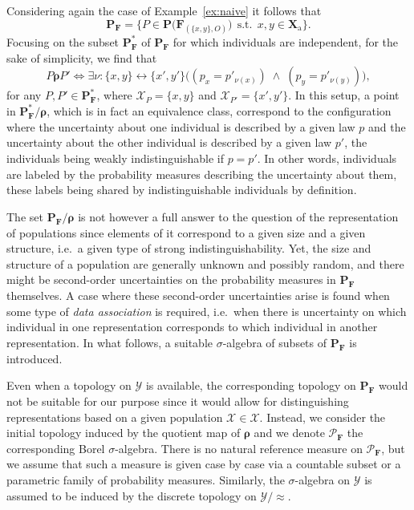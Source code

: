 \documentclass{aptpub}
\numberwithin{equation}{section}
\begin{document}
\begin{example}
Considering again the case of Example~\ref{ex:naive} it follows that
{\begin{equation*}{
{\mathbf{P}}_{\mathbf{F}} = \big\{ P \in {\mathbf{P}}\big({\mathbf{F}}_{(\{x,y\},O)}\big) {\;\,\mbox{s.t.}\;\,} x,y \in {\mathbf{X}}_{\mathrm{a}} \big\}.
}\end{equation*}}
Focusing on the subset ${\mathbf{P}}^*_{\mathbf{F}}$ of ${\mathbf{P}}_{\mathbf{F}}$ for which individuals are independent, for the sake of simplicity, we find that
{\begin{equation*}{
P {\boldsymbol{\rho}} P' {\Leftrightarrow} \exists \nu : \{x,y\} {\leftrightarrow} \{x',y'\} \big( (p_x = p'_{\nu(x)}) {\;\wedge\;} (p_y = p'_{\nu(y)}) \big),
}\end{equation*}}
for any $P,P' \in {\mathbf{P}}^*_{\mathbf{F}}$, where ${\mathcal{X}}_P = \{x,y\}$ and ${\mathcal{X}}_{P'} = \{x',y'\}$. In this setup, a point in ${\mathbf{P}}^*_{\mathbf{F}}/{\boldsymbol{\rho}}$, which is in fact an equivalence class, correspond to the configuration where the uncertainty about one individual is described by a given law $p$ and the uncertainty about the other individual is described by a given law $p'$, the individuals being weakly indistinguishable if $p = p'$. In other words, individuals are labeled by the probability measures describing the uncertainty about them, these labels being shared by indistinguishable individuals by definition.
\end{example}

The set ${\mathbf{P}}_{\mathbf{F}}/{\boldsymbol{\rho}}$ is not however a full answer to the question of the representation of populations since elements of it correspond to a given size and a given structure, i.e.\ a given type of strong indistinguishability. Yet, the size and structure of a population are generally unknown and possibly random, and there might be second-order uncertainties on the probability measures in ${\mathbf{P}}_{\mathbf{F}}$ themselves. A case where these second-order uncertainties arise is found when some type of \emph{data association} is required, i.e.\ when there is uncertainty on which individual in one representation corresponds to which individual in another representation. In what follows, a suitable $\sigma$-algebra of subsets of ${\mathbf{P}}_{\mathbf{F}}$ is introduced.

Even when a topology on ${\boldsymbol{\mathcal{Y}}}$ is available, the corresponding topology on ${\mathbf{P}}_{\mathbf{F}}$ would not be suitable for our purpose since it would allow for distinguishing representations based on a given population ${\mathcal{X}} \in {\boldsymbol{\mathcal{X}}}$. Instead, we consider the initial topology induced by the quotient map of ${\boldsymbol{\rho}}$ and we denote ${\mathcal{P}}_{\mathbf{F}}$ the corresponding Borel $\sigma$-algebra. There is no natural reference measure on ${\mathcal{P}}_{\mathbf{F}}$, but we assume that such a measure is given case by case via a countable subset or a parametric family of probability measures. Similarly, the $\sigma$-algebra on ${\boldsymbol{\mathcal{Y}}}$ is assumed to be induced by the discrete topology on ${\boldsymbol{\mathcal{Y}}}{/\!{\approx}}$.
\end{document}
